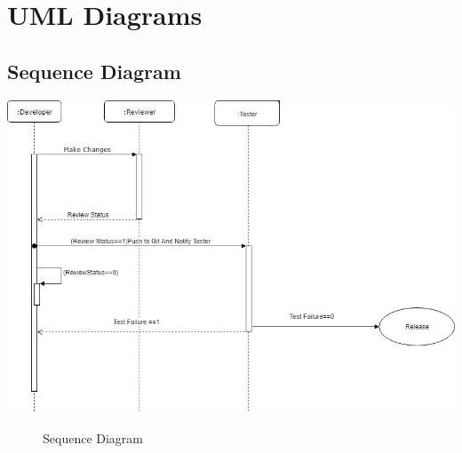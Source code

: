 \documentclass[oneside,a4paper,12pt]{book}
\begin{document}
\section{UML Diagrams}

\subsection{Sequence Diagram}
\vspace*{1\baselineskip}
\includegraphics[width=\textwidth]{sequence.png}
\begin{figure}[h]
    \caption{Sequence Diagram}
    \label{fig:Sequence Diagram}
\end{figure}
\end{document}
